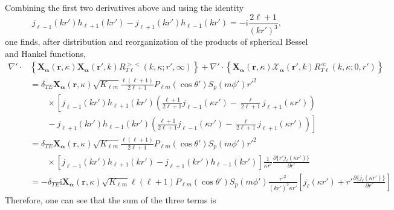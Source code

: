 \documentclass{article}
\begin{document}
Combining the first two derivatives above and using the identity
\begin{equation}
j_{\ell - 1}(kr')h_{\ell + 1}(kr') - j_{\ell + 1}(kr')h_{\ell - 1}(kr') = -\mathrm{i}\frac{2\ell + 1}{(kr')^3},
\end{equation}
one finds, after distribution and reorganization of the products of spherical Bessel and Hankel functions, 
\begin{equation}
\begin{split}
\nabla'\cdot&\left\{\mathbf{X}_{\bm{\alpha}}(\mathbf{r},\kappa)\mathbf{X}_{\bm{\alpha}}(\mathbf{r}',k)R_{T\ell}^{><}(k,\kappa;r',\infty)\right\} + \nabla'\cdot\left\{\mathbf{X}_{\bm{\alpha}}(\mathbf{r},\kappa)\bm{\mathcal{X}}_{\bm{\alpha}}(\mathbf{r}',k)R_{T\ell}^\ll(k,\kappa;0,r')\right\}\\
&=\delta_{TE}\mathbf{X}_{\bm{\alpha}}(\mathbf{r},\kappa)\sqrt{K_{\ell m}}\frac{\ell(\ell + 1)}{2\ell + 1}P_{\ell m}(\cos\theta')S_p(m\phi')r'^2\\
&\qquad\times\left[j_{\ell - 1}(kr')h_{\ell + 1}(kr')\left(\frac{\ell + 1}{2\ell + 1}j_{\ell - 1}(\kappa r') - \frac{\ell}{2\ell + 1}j_{\ell + 1}(\kappa r')\right)\right.\\
&\qquad-\left.j_{\ell + 1}(kr')h_{\ell - 1}(kr')\left(\frac{\ell + 1}{2\ell + 1}j_{\ell - 1}(\kappa r') - \frac{\ell}{2\ell + 1}j_{\ell + 1}(\kappa r')\right)\right]\\
&= \delta_{TE}\mathbf{X}_{\bm{\alpha}}(\mathbf{r},\kappa)\sqrt{K_{\ell m}}\frac{\ell(\ell + 1)}{2\ell + 1}P_{\ell m}(\cos\theta')S_p(m\phi')r'^2\\
&\qquad\times\left[j_{\ell - 1}(kr')h_{\ell + 1}(kr') - j_{\ell + 1}(kr')h_{\ell - 1}(kr')\right]\frac{1}{\kappa r'}\frac{\partial\{r'j_\ell(\kappa r')\}}{\partial r'}\\
&= -\delta_{TE}\mathrm{i}\mathbf{X}_{\bm{\alpha}}(\mathbf{r},\kappa)\sqrt{K_{\ell m}}\ell(\ell + 1)P_{\ell m}(\cos\theta')S_p(m\phi')\frac{r'^2}{(kr')^3\kappa r'}\left[j_\ell(\kappa r') + r'\frac{\partial\{j_\ell(\kappa r')\}}{\partial r'}\right]
\end{split}
\end{equation}
Therefore, one can see that the sum of the three terms is
\end{document}
